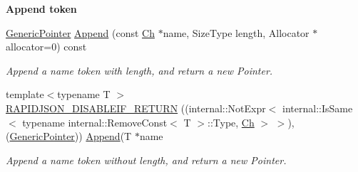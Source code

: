 \begin{Indent}{\bf Append token}
\begin{DoxyCompactItemize}
\hyperlink{class_generic_pointer}{Generic\+Pointer} \hyperlink{class_generic_pointer_a0f2c0586fd945bf25a5da228d085f74b}{Append} (const \hyperlink{class_generic_pointer_ab292356c11b4015c98d21b966b11f285}{Ch} $\ast$name, Size\+Type length, Allocator $\ast$allocator=0) const 
\begin{DoxyCompactList}\small\item\em Append a name token with length, and return a new Pointer. \end{DoxyCompactList}\item 
{\footnotesize template$<$typename T $>$ }\\\hyperlink{class_generic_pointer_aaf4d7d852098878d24188d134182d42f}{R\+A\+P\+I\+D\+J\+S\+O\+N\+\_\+\+D\+I\+S\+A\+B\+L\+E\+I\+F\+\_\+\+R\+E\+T\+U\+RN} ((internal\+::\+Not\+Expr$<$ internal\+::\+Is\+Same$<$ typename internal\+::\+Remove\+Const$<$ T $>$\+::Type, \hyperlink{class_generic_pointer_ab292356c11b4015c98d21b966b11f285}{Ch} $>$ $>$),(\hyperlink{class_generic_pointer}{Generic\+Pointer})) \hyperlink{class_generic_pointer_a6d55ac55724890527e583f26b2774f02}{Append}(T $\ast$name
\begin{DoxyCompactList}\small\item\em Append a name token without length, and return a new Pointer. \end{DoxyCompactList}\end{DoxyCompactItemize}
\end{Indent}
